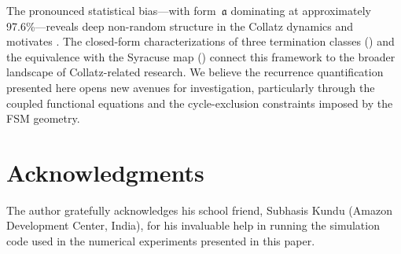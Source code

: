 \documentclass[11pt,a4paper]{article}
\theoremstyle{plain}
\theoremstyle{definition}
\begin{document}
The pronounced statistical bias---with form~$\mathfrak{a}$ dominating at approximately 97.6\%---reveals deep non-random structure in the Collatz dynamics and motivates . The closed-form characterizations of three termination classes () and the equivalence with the Syracuse map () connect this framework to the broader landscape of Collatz-related research. We believe the recurrence quantification presented here opens new avenues for investigation, particularly through the coupled functional equations and the cycle-exclusion constraints imposed by the FSM geometry.

\section*{Acknowledgments}
The author gratefully acknowledges his school friend, Subhasis Kundu (Amazon Development Center, India), for his invaluable help in running the simulation code used in the numerical experiments presented in this paper.
\end{document}
